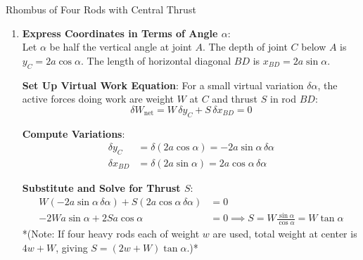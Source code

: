\begin{examplebox}{Rhombus of Four Rods with Central Thrust}
\begin{enumerate}[leftmargin=1.5em]
    \item \textbf{Express Coordinates in Terms of Angle $\alpha$}:\\
    Let $\alpha$ be half the vertical angle at joint $A$.
    The depth of joint $C$ below $A$ is $y_C = 2a \cos\alpha$.
    The length of horizontal diagonal $BD$ is $x_{BD} = 2a \sin\alpha$.

\textbf{Set Up Virtual Work Equation}:
    For a small virtual variation $\delta \alpha$, the active forces doing work are weight $W$ at $C$ and thrust $S$ in rod $BD$:
    \begin{equation*}
        \delta W_{\text{net}} = W \, \delta y_C + S \, \delta x_{BD} = 0
    \end{equation*}

\textbf{Compute Variations}:
    \begin{align*}
        \delta y_C &= \delta(2a \cos\alpha) = -2a \sin\alpha \, \delta\alpha \\
        \delta x_{BD} &= \delta(2a \sin\alpha) = 2a \cos\alpha \, \delta\alpha
    \end{align*}

\textbf{Substitute and Solve for Thrust $S$}:
    \begin{align*}
        W (-2a \sin\alpha \, \delta\alpha) + S (2a \cos\alpha \, \delta\alpha) &= 0 \\
        -2W a \sin\alpha + 2S a \cos\alpha &= 0 \implies S = W \frac{\sin\alpha}{\cos\alpha} = W \tan\alpha
    \end{align*}
    *(Note: If four heavy rods each of weight $w$ are used, total weight at center is $4w + W$, giving $S = (2w + W)\tan\alpha$.)*
\end{enumerate}
\end{examplebox}

